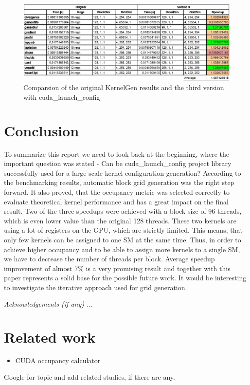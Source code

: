 \documentclass{usiinftr}
\begin{document}
\begin{figure}[H]
\begin{center}
  \includegraphics[width=1\textwidth]{figures/kernelgen_v3}
  \caption{Comparsion of the original KernelGen results and the third version with cuda\_launch\_config \label{fig:clc3}}  
\end{center}
\end{figure}

\section{Conclusion} 

To summarize this report we need to look back at the beginning, where the important question was stated - Can be cuda\_launch\_config project library successfully used for a large-scale kernel configuration generation? According to the benchmarking results, automatic block grid generation was the right step forward. It also proved, that the occupancy metric was selected correctly to evaluate theoretical kernel performance and has a great impact on the final result. Two of the three speedups were achieved with a block size of 96 threads, which is even lower value than the original 128 threads. These two kernels are using a lot of registers on the GPU, which are strictly limited. This means, that only few kernels can be assigned to one SM at the same time. Thus, in order to achieve higher occupancy and to be able to assign more kernels to a single SM, we have to decrease the number of threads per block. Average speedup improvement of almost 7\% is a very promising result and together with this paper represents a solid base for the possible future work. It would be interesting to investigate the iterative approach used for grid generation.

\emph{Acknowledgements (if any) ...}

\section{Related work}

\begin{itemize}
\item CUDA occupancy calculator
\end{itemize}

Google for topic and add related studies, if there are any.



\end{document}
